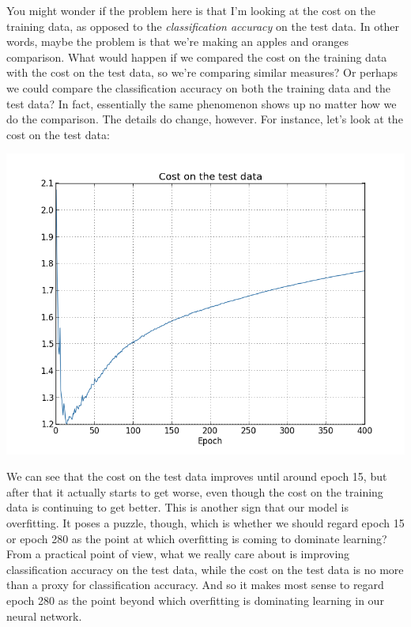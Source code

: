 \documentclass[a4paper,twoside,10pt]{book}
\begin{document}
You might wonder if the problem here is that I'm looking at the cost on the training data, as opposed to the \textit{classification accuracy} on the test data. In other words, maybe the problem is that we're making an apples and oranges comparison. What would happen if we compared the cost on the training data with the cost on the test data, so we're comparing similar measures? Or perhaps we could compare the classification accuracy on both the training data and the test data? In fact, essentially the same phenomenon shows up no matter how we do the comparison. The details do change, however. For instance, let's look at the cost on the test data:
\begin{center}
	\includegraphics[width=0.6\linewidth]{figures/ch3/overfitting3}
\end{center}
We can see that the cost on the test data improves until around epoch 15, but after that it actually starts to get worse, even though the cost on the training data is continuing to get better. This is another sign that our model is overfitting. It poses a puzzle, though, which is whether we should regard epoch 15 or epoch 280 as the point at which overfitting is coming to dominate learning? From a practical point of view, what we really care about is improving classification accuracy on the test data, while the cost on the test data is no more than a proxy for classification accuracy. And so it makes most sense to regard epoch 280 as the point beyond which overfitting is dominating learning in our neural network.
\end{document}

